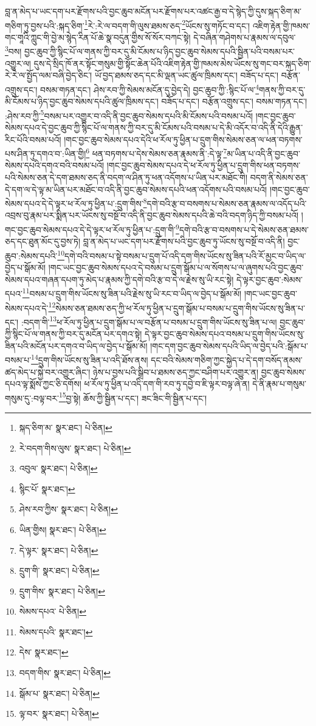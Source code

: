 བླ་ན་མེད་པ་ཡང་དག་པར་རྫོགས་པའི་བྱང་ཆུབ་མངོན་པར་རྫོགས་པར་འཚང་རྒྱ་བ་དེ་སྙེད་ཀྱི་དུས་སྐད་ཅིག་མ་གཅིག་ཏུ་བྱས་པའི་:སྐད་ཅིག་\footnote{སྐད་ཅིག་མ་  སྣར་ཐང་།  པེ་ཅིན། }རེ་:རེ་ལ་བདག་གི་ལུས་ཐམས་ཅད་\footnote{རེ་བདག་གིས་ལུས་  སྣར་ཐང་།  པེ་ཅིན། }ཡོངས་སུ་གཏོང་བ་དང་། འཇིག་རྟེན་གྱི་ཁམས་གང་གཱའི་ཀླུང་གི་བྱེ་མ་སྙེད་རིན་པོ་ཆེ་སྣ་བདུན་གྱིས་སོ་སོར་བཀང་སྟེ། དེ་བཞིན་གཤེགས་པ་རྣམས་ལ་དབུལ་\footnote{འབུལ་  སྣར་ཐང་།  པེ་ཅིན། }བས། བྱང་ཆུབ་ཀྱི་སྙིང་པོ་ལ་གནས་ཀྱི་བར་དུ་མི་ངོམས་པ་ཉིད་བྱང་ཆུབ་སེམས་དཔའི་སྦྱིན་པའི་བསམ་པར་འགྱུར་ལ། དུས་དེ་སྲིད་ཁོ་ནར་སྟོང་གསུམ་གྱི་སྟོང་ཆེན་པོའི་འཇིག་རྟེན་གྱི་ཁམས་མེས་ཡོངས་སུ་གང་བར་སྐད་ཅིག་རེ་རེ་ལ་སྤྱོད་ལམ་བཞི་བྱེད་ཅིང་། ཡོ་བྱད་ཐམས་ཅད་དང་མི་ལྡན་ཡང་ཚུལ་ཁྲིམས་དང་། བཟོད་པ་དང་། བརྩོན་འགྲུས་དང་། བསམ་གཏན་དང་། ཤེས་རབ་ཀྱི་སེམས་མངོན་དུ་བྱེད་དེ། བྱང་ཆུབ་ཀྱི་:སྙིང་པོ་ལ་\footnote{སྙིང་པོ་  སྣར་ཐང་། }གནས་ཀྱི་བར་དུ་མི་ངོམས་པ་ཉིད་བྱང་ཆུབ་སེམས་དཔའི་ཚུལ་ཁྲིམས་དང་། བཟོད་པ་དང་། བརྩོན་འགྲུས་དང་། བསམ་གཏན་དང་། :ཤེས་རབ་ཀྱི་\footnote{ཤེས་རབ་ཀྱིས་  སྣར་ཐང་།  པེ་ཅིན། }བསམ་པར་འགྱུར་བ་འདི་ནི་བྱང་ཆུབ་སེམས་དཔའི་མི་ངོམས་པའི་བསམ་པའོ། །གང་བྱང་ཆུབ་སེམས་དཔའ་དེ་བྱང་ཆུབ་ཀྱི་སྙིང་པོ་ལ་གནས་ཀྱི་བར་དུ་མི་ངོམས་པའི་བསམ་པ་དེ་མི་འདོར་བ་འདི་ནི་དེའི་རྒྱུན་རིང་པོའི་བསམ་པའོ། །གང་བྱང་ཆུབ་སེམས་དཔའ་དེའི་ཕ་རོལ་ཏུ་ཕྱིན་པ་དྲུག་གིས་སེམས་ཅན་ལ་ཕན་བཏགས་པས་ཤིན་ཏུ་དགའ་བ་:ཡིན་གྱི།\footnote{ཡིན་གྱིས།  སྣར་ཐང་།  པེ་ཅིན། } ཕན་བཏགས་པ་དེས་སེམས་ཅན་རྣམས་ནི་:དེ་ལྟ་\footnote{དེ་ལྟར་  སྣར་ཐང་།  པེ་ཅིན། }མ་ཡིན་པ་འདི་ནི་བྱང་ཆུབ་སེམས་དཔའི་དགའ་བའི་བསམ་པའོ། །གང་བྱང་ཆུབ་སེམས་དཔའ་དེ་ཕ་རོལ་ཏུ་ཕྱིན་པ་དྲུག་གིས་ཕན་བཏགས་པའི་སེམས་ཅན་དེ་དག་ཐམས་ཅད་ནི་བདག་ལ་ཤིན་ཏུ་ཕན་འདོགས་པ་ཡིན་པར་མཐོང་གི། བདག་ནི་སེམས་ཅན་དེ་དག་ལ་དེ་ལྟ་མ་ཡིན་པར་མཐོང་བ་འདི་ནི་བྱང་ཆུབ་སེམས་དཔའི་ཕན་འདོགས་པའི་བསམ་པའོ། །གང་བྱང་ཆུབ་སེམས་དཔའ་དེ་དེ་ལྟར་ཕ་རོལ་ཏུ་ཕྱིན་པ་:དྲུག་གིས་\footnote{དྲུག་གི་  སྣར་ཐང་།  པེ་ཅིན། }དགེ་བའི་རྩ་བ་བསགས་པ་སེམས་ཅན་རྣམས་ལ་འདོད་པའི་འབྲས་བུ་རྣམ་པར་སྨིན་པར་ཡོངས་སུ་བསྔོ་བ་འདི་ནི་བྱང་ཆུབ་སེམས་དཔའི་ཆེ་བའི་བདག་ཉིད་ཀྱི་བསམ་པའོ། །གང་བྱང་ཆུབ་སེམས་དཔའ་དེ་དེ་ལྟར་ཕ་རོལ་ཏུ་ཕྱིན་པ་:དྲུག་གི་\footnote{དྲུག་གིས་  སྣར་ཐང་།  པེ་ཅིན། }དགེ་བའི་རྩ་བ་བསགས་པ་དེ་སེམས་ཅན་ཐམས་ཅད་དང་ཐུན་མོང་དུ་བྱས་ཏེ། བླ་ན་མེད་པ་ཡང་དག་པར་རྫོགས་པའི་བྱང་ཆུབ་ཏུ་ཡོངས་སུ་བསྔོ་བ་འདི་ནི། བྱང་ཆུབ་:སེམས་དཔའི་\footnote{སེམས་དཔའ་  པེ་ཅིན། }དགེ་བའི་བསམ་པ་སྟེ་བསམ་པ་དྲུག་པོ་འདི་དག་གིས་ཡོངས་སུ་ཟིན་པའི་རོ་མྱང་བ་ཡིད་ལ་བྱེད་པ་སྒོམ་མོ། །གང་ཡང་བྱང་ཆུབ་སེམས་དཔའ་དེ་བསམ་པ་དྲུག་སྒོམ་པ་ལ་སོགས་པ་ལ་ཞུགས་པའི་བྱང་ཆུབ་སེམས་དཔའ་གཞན་དཔག་ཏུ་མེད་པ་རྣམས་ཀྱི་དགེ་བའི་རྩ་བ་དེ་ལ་རྗེས་སུ་ཡི་རང་སྟེ། དེ་ལྟར་བྱང་ཆུབ་:སེམས་དཔའ་\footnote{སེམས་དཔའི་  སྣར་ཐང་། }བསམ་པ་དྲུག་གིས་ཡོངས་སུ་ཟིན་པའི་རྗེས་སུ་ཡི་རང་བ་ཡིད་ལ་བྱེད་པ་སྒོམ་མོ། །གང་ཡང་བྱང་ཆུབ་སེམས་དཔའ་དེ་\footnote{དེས་  སྣར་ཐང་། }སེམས་ཅན་ཐམས་ཅད་ཀྱི་ཕ་རོལ་ཏུ་ཕྱིན་པ་དྲུག་སྒོམ་པ་བསམ་པ་དྲུག་གིས་ཡོངས་སུ་ཟིན་པ་དང་། :བདག་གི་\footnote{བདག་གིས་  སྣར་ཐང་།  པེ་ཅིན། }ཕ་རོལ་ཏུ་ཕྱིན་པ་དྲུག་སྒོམ་པ་ལ་བརྩོན་པ་བསམ་པ་དྲུག་གིས་ཡོངས་སུ་ཟིན་པ་ལ། བྱང་ཆུབ་ཀྱི་སྙིང་པོ་ལ་གནས་ཀྱི་བར་དུ་མངོན་པར་དགའ་སྟེ། དེ་ལྟར་བྱང་ཆུབ་སེམས་དཔའ་བསམ་པ་དྲུག་གིས་ཡོངས་སུ་ཟིན་པའི་མངོན་པར་དགའ་བ་ཡིད་ལ་བྱེད་པ་སྒོམ་མོ། །གང་དག་བྱང་ཆུབ་སེམས་དཔའི་ཡིད་ལ་བྱེད་པའི་:སྒོམ་པ་བསམ་པ་\footnote{སྒོམ་པ་  སྣར་ཐང་།  པེ་ཅིན། }དྲུག་གིས་ཡོངས་སུ་ཟིན་པ་འདི་ཐོས་ནས། དང་བའི་སེམས་གཅིག་ཀྱང་སྐྱེད་པ་དེ་དག་བསོད་ནམས་ཚད་མེད་པ་སྐྱེ་བར་འགྱུར་ཞིང་། ཉེས་པ་བྱས་པའི་སྒྲིབ་པ་ཐམས་ཅད་ཀྱང་བཤིག་པར་འགྱུར་ན། བྱང་ཆུབ་སེམས་དཔའ་ལྟ་སྨོས་ཀྱང་ཅི་དགོས། ཕ་རོལ་ཏུ་ཕྱིན་པ་འདི་དག་གི་རབ་ཏུ་དབྱེ་བ་ཇི་ལྟར་བལྟ་ཞེ་ན། དེ་ནི་རྣམ་པ་གསུམ་གསུམ་དུ་:བལྟ་བར་\footnote{ལྟ་བར་  སྣར་ཐང་།  པེ་ཅིན། }བྱ་སྟེ། ཆོས་ཀྱི་སྦྱིན་པ་དང་། ཟང་ཟིང་གི་སྦྱིན་པ་དང་། 